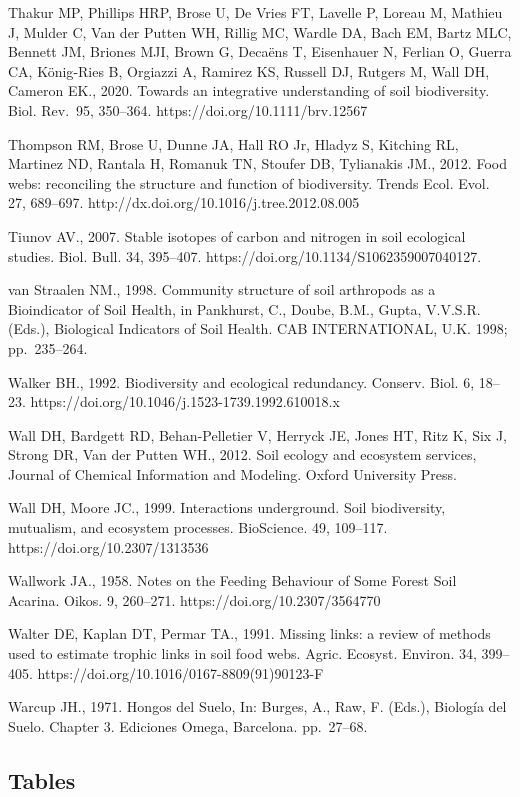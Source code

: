 \documentclass[10pt,oneside]{article}
\begin{document}
Thakur MP, Phillips HRP, Brose U, De Vries FT, Lavelle P, Loreau M,
Mathieu J, Mulder C, Van der Putten WH, Rillig MC, Wardle DA, Bach EM,
Bartz MLC, Bennett JM, Briones MJI, Brown G, Decaëns T, Eisenhauer N,
Ferlian O, Guerra CA, König‐Ries B, Orgiazzi A, Ramirez KS, Russell DJ,
Rutgers M, Wall DH, Cameron EK., 2020. Towards an integrative
understanding of soil biodiversity. Biol. Rev.~95, 350--364.
https://doi.org/10.1111/brv.12567

Thompson RM, Brose U, Dunne JA, Hall RO Jr, Hladyz S, Kitching RL,
Martinez ND, Rantala H, Romanuk TN, Stoufer DB, Tylianakis JM., 2012.
Food webs: reconciling the structure and function of biodiversity.
Trends Ecol. Evol. 27, 689--697.
http://dx.doi.org/10.1016/j.tree.2012.08.005

Tiunov AV., 2007. Stable isotopes of carbon and nitrogen in soil
ecological studies. Biol. Bull. 34, 395--407.
https://doi.org/10.1134/S1062359007040127.

van Straalen NM., 1998. Community structure of soil arthropods as a
Bioindicator of Soil Health, in Pankhurst, C., Doube, B.M., Gupta,
V.V.S.R. (Eds.), Biological Indicators of Soil Health. CAB
INTERNATIONAL, U.K. 1998; pp.~235--264.

Walker BH., 1992. Biodiversity and ecological redundancy. Conserv. Biol.
6, 18--23. https://doi.org/10.1046/j.1523-1739.1992.610018.x

Wall DH, Bardgett RD, Behan-Pelletier V, Herryck JE, Jones HT, Ritz K,
Six J, Strong DR, Van der Putten WH., 2012. Soil ecology and ecosystem
services, Journal of Chemical Information and Modeling. Oxford
University Press.

Wall DH, Moore JC., 1999. Interactions underground. Soil biodiversity,
mutualism, and ecosystem processes. BioScience. 49, 109--117.
https://doi.org/10.2307/1313536

Wallwork JA., 1958. Notes on the Feeding Behaviour of Some Forest Soil
Acarina. Oikos. 9, 260--271. https://doi.org/10.2307/3564770

Walter DE, Kaplan DT, Permar TA., 1991. Missing links: a review of
methods used to estimate trophic links in soil food webs. Agric.
Ecosyst. Environ. 34, 399--405.
https://doi.org/10.1016/0167-8809(91)90123-F

Warcup JH., 1971. Hongos del Suelo, In: Burges, A., Raw, F. (Eds.),
Biología del Suelo. Chapter 3. Ediciones Omega, Barcelona. pp.~27--68.

\newpage

\hypertarget{tables}{%
\subsection{Tables}\label{tables}}
\end{document}
